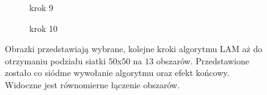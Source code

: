 \begin{figure}[h]
\begin{subfigure}{.5\textwidth}
    \centering
    \caption[short]{krok 9}
\end{subfigure}
\begin{subfigure}{.5\textwidth}
    \centering
    \caption[short]{krok 10}
\end{subfigure}
\caption{Obrazki przedstawiają wybrane, kolejne kroki algorytmu LAM aż do otrzymaniu podziału siatki $50$x$50$ na $13$ obszarów.
Przedstawione zostało co siódme wywołanie algorytmu oraz efekt końcowy. Widoczne jest równomierne łączenie obszarów.}
\label{im:lam_steps}
\end{figure}
\FloatBarrier
